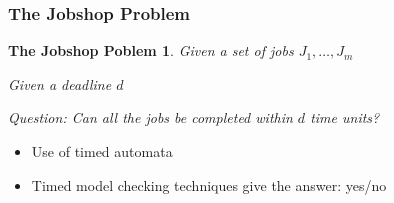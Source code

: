 \documentclass[professionalfont]{beamer}
\newtheorem{jobshopproblem}{The Jobshop Poblem}
\newcommand{\couleur}[1]{\textcolor{couleurimportante}{#1}}
\begin{document}
\begin{frame}
 \frametitle{The Jobshop Problem}

 
\begin{jobshopproblem}
	Given a set of jobs $J_1,\dots,J_m$
 
	Given a deadline $d$
 
	Question: \couleur{Can all the jobs be completed within $d$ time units?}
\end{jobshopproblem}

\pause

\begin{itemize}
	\item Use of \couleur{timed automata}
	
	\bigskip
	
	\item Timed model checking techniques give the answer: \couleur{yes/no}
\end{itemize}

\end{frame}

%    
% 
% 
\end{document}
